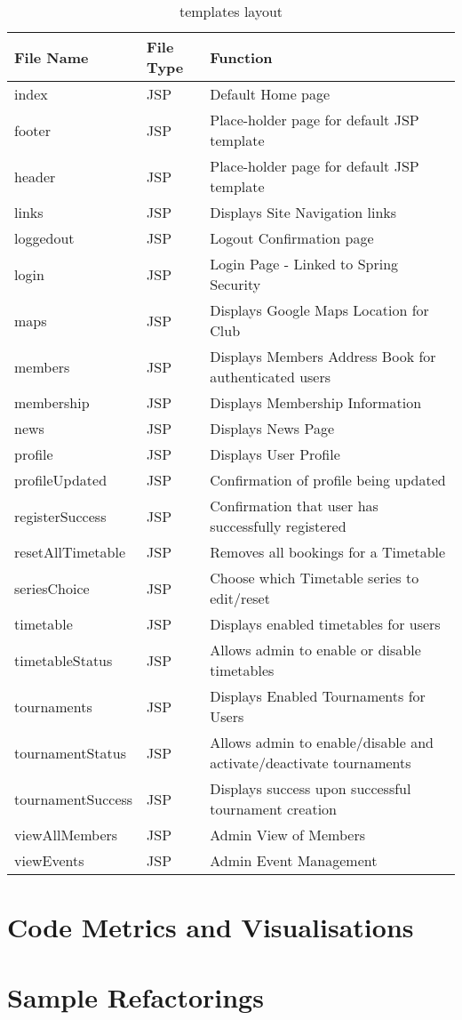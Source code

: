 \begin{table}[H]
\begin{center}
    \begin{tabular}{| l | l | p{5cm} |}
    \hline
    File Name & File Type & Function\\ \hline
	index & JSP & Default Home page\\ \hline
	footer & JSP & Place-holder page for default JSP template\\ \hline	
	header & JSP & Place-holder page for default JSP template\\ \hline		
	links & JSP & Displays Site Navigation links\\ \hline	
	loggedout & JSP & Logout Confirmation page\\ \hline	
	login & JSP & Login Page - Linked to Spring Security\\ \hline	
	maps & JSP & Displays Google Maps Location for Club\\ \hline	
	members & JSP & Displays Members Address Book for authenticated users\\ \hline	
	membership & JSP & Displays Membership Information\\ \hline	
	news & JSP & Displays News Page\\ \hline	
	profile & JSP & Displays User Profile\\ \hline	
	profileUpdated & JSP & Confirmation of profile being updated\\ \hline	
	registerSuccess & JSP & Confirmation that user has successfully registered\\ \hline	
	resetAllTimetable & JSP & Removes all bookings for a Timetable\\ \hline	
	seriesChoice & JSP & Choose which Timetable series to edit/reset\\ \hline	
	timetable & JSP & Displays enabled timetables for users\\ \hline	
	timetableStatus & JSP & Allows admin to enable or disable timetables\\ \hline	
	tournaments & JSP & Displays Enabled Tournaments for Users\\ \hline	
	tournamentStatus & JSP & Allows admin to enable/disable and activate/deactivate tournaments\\ \hline	
	tournamentSuccess & JSP & Displays success upon successful tournament creation\\ \hline	
	viewAllMembers & JSP & Admin View of Members\\ \hline	
	viewEvents & JSP & Admin Event Management\\ \hline	
    \end{tabular}
\end{center}
\caption{templates layout}
\end{table}
\pagebreak




\section{Code Metrics and Visualisations}

\section{Sample Refactorings}
